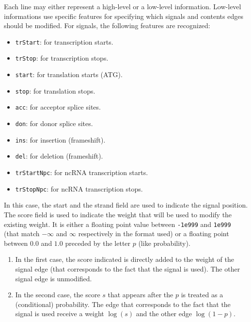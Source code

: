 Each line may either represent a high-level or a low-level
information.  Low-level informations use specific features for
specifying which signals and contents edges should be modified. For
signals, the following features are recognized:
\begin{itemize}
\item \texttt{trStart}: for transcription starts.
\item \texttt{trStop}: for transcription stops.
\item \texttt{start}: for translation starts (ATG).
\item \texttt{stop}: for translation stops.
\item \texttt{acc}: for acceptor splice sites.
\item \texttt{don}: for donor splice sites.
\item \texttt{ins}: for insertion (frameshift).
\item \texttt{del}: for deletion (frameshift).
\item \texttt{trStartNpc}: for ncRNA transcription starts.
\item \texttt{trStopNpc}: for ncRNA transcription stops.
\end{itemize}
In this case, the start and the strand field are used to indicate the
signal position. The score field is used to indicate the weight that
will be used to modify the existing weight. It is either a floating
point value between \texttt{-1e999} and \texttt{1e999} (that match
$-\infty$ and $\infty$ respectively in the format used) or a floating point
between $0.0$ and $1.0$ preceded by the letter $p$ (like probability).

\begin{enumerate}
\item In the first case, the score indicated is directly added to the
  weight of the signal edge (that corresponds to the fact that the
  signal is used). The other signal edge is unmodified.
\item In the second case, the score $s$ that appears after the $p$ is
  treated as a (conditional) probability. The edge that corresponds to
  the fact that the signal is used receive a weight $\log(s)$ and the
  other edge $\log(1-p)$.
\end{enumerate}

